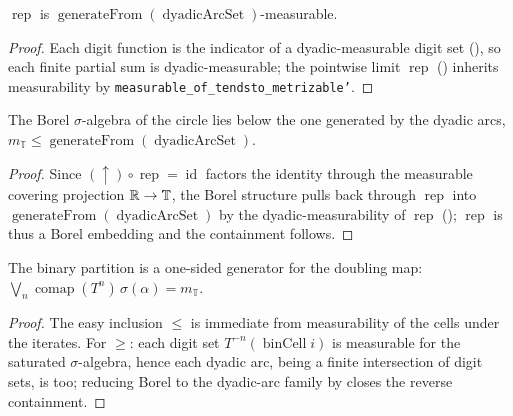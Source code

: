 \begin{lemma}\label{measurable_rep_dyadic}
  \leanok
  \(\operatorname{rep}\) is \(\operatorname{generateFrom}(\operatorname{dyadicArcSet})\)-measurable.
\end{lemma}
\begin{proof}\leanok
  Each digit function is the indicator of a dyadic-measurable digit set
  (), so each finite partial sum is dyadic-measurable; the
  pointwise limit \(\operatorname{rep}\) () inherits measurability by
  \texttt{measurable\_of\_tendsto\_metrizable'}.
\end{proof}

\begin{theorem}\label{borel_le_generateFrom_dyadicArcs}
  \leanok
  The Borel \(\sigma\)-algebra of the circle lies below the one generated by the dyadic arcs,
  \(m_{\mathbb T}\le\operatorname{generateFrom}(\operatorname{dyadicArcSet})\).
\end{theorem}
\begin{proof}\leanok
  Since \((\uparrow)\circ\operatorname{rep}=\operatorname{id}\) factors the identity through the
  measurable covering projection \(\mathbb{R}\to\mathbb T\), the Borel structure pulls back through
  \(\operatorname{rep}\) into \(\operatorname{generateFrom}(\operatorname{dyadicArcSet})\) by the
  dyadic-measurability of \(\operatorname{rep}\) (); \(\operatorname{rep}\)
  is thus a Borel embedding and the containment follows.
\end{proof}

\begin{theorem}\label{binPartition_isGenerating}
  \leanok
  The binary partition is a one-sided generator for the doubling map:
  \(\bigvee_{n}\operatorname{comap}(T^n)\,\sigma(\alpha)=m_{\mathbb T}\).
\end{theorem}
\begin{proof}\leanok
  The easy inclusion \(\le\) is immediate from measurability of the cells under the iterates. For
  \(\ge\): each digit set \(T^{-n}(\operatorname{binCell}i)\) is measurable for the saturated
  \(\sigma\)-algebra, hence each dyadic arc, being a finite intersection of digit sets, is too;
  reducing Borel to the dyadic-arc family by  closes the
  reverse containment.
\end{proof}

